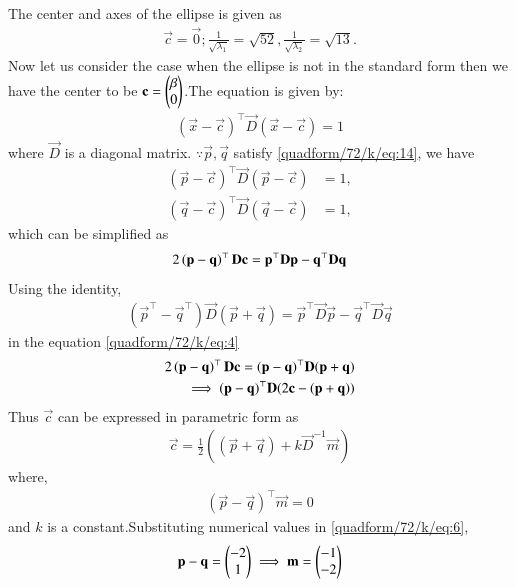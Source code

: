 The center and axes of the ellipse is given as
\begin{align}
\vec{c} = \vec{0};
\frac{1}{\sqrt{\lambda_1}}  = \sqrt{52},
\frac{1}{\sqrt{\lambda_2}} =\sqrt{13}.
\end{align}
Now let us consider the case when the ellipse is not in the standard form then we have the center to be $\mathbf{c}=\begin{pmatrix}\beta\\0\end{pmatrix}$.The equation is given by:
\begin{align}
(\vec{x}-\vec{c})^{\top}\vec{D}(\vec{x}-\vec{c})=1\label{quadform/72/k/eq:14}
\end{align}
where $\vec{D}$ is a diagonal matrix.
$\because \vec{p}, \vec{q}$ satisfy \eqref{quadform/72/k/eq:14}, we have
\begin{align}
\label{quadform/72/k/eq:ellipse_act_ab}
(\vec{p}-\vec{c})^{\top}\vec{D}(\vec{p}-\vec{c}) &= 1,
\\
(\vec{q}-\vec{c})^{\top}\vec{D}(\vec{q}-\vec{c}) &= 1,
\end{align}
which can be simplified as
\begin{align}
    2\left(\mathbf{p}-\mathbf{q}\right)^{\top}\mathbf{D}\mathbf{c}=\mathbf{p}^{\top}\mathbf{D}\mathbf{p}-\mathbf{q}^{\top}\mathbf{D}\mathbf{q} \label{quadform/72/k/eq:4}
\end{align}
Using the identity,
\begin{align}
   (\vec{p}^{\top}-\vec{q}^{\top})\vec{D}(\vec{p}+\vec{q})
   =\vec{p}^{\top}\vec{D}\vec{p}-\vec{q}^{\top}\vec{D}\vec{q}
\end{align}
in the equation \eqref{quadform/72/k/eq:4}
\begin{align}
    2\left(\mathbf{p}-\mathbf{q}\right)^{\top}\mathbf{D}\mathbf{c}=(\mathbf{p}-\mathbf{q})^{\top}\mathbf{D}(\mathbf{p}+\mathbf{q})\\
    \implies (\mathbf{p}-\mathbf{q})^{\top}\mathbf{D}(2\mathbf{c}-(\mathbf{p}+\mathbf{q}))
\end{align}
Thus $\vec{c}$ can be expressed in parametric form as
\begin{align}
\vec{c}=\frac{1}{2}((\vec{p}+\vec{q})+k\vec{D}^{-1}\vec{m}) \label{quadform/72/k/eq:7}
\end{align}
where,
\begin{align}
    (\vec{p}-\vec{q})^{\top}\vec{m}=0 \label{quadform/72/k/eq:6}
\end{align}
and $k$ is a constant.Substituting numerical values in \eqref{quadform/72/k/eq:6}, \begin{align}
    \mathbf{p}-\mathbf{q} = \begin{pmatrix}-2 \\ 1\end{pmatrix} \implies \mathbf{m} = \begin{pmatrix}-1 \\ -2\end{pmatrix}
\end{align}
